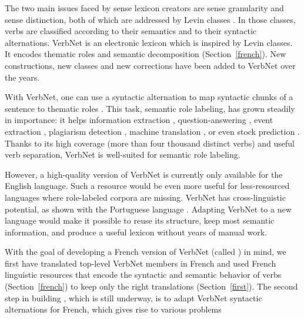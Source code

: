 The two main issues faced by sense lexicon creators are sense granularity and
sense distinction, both of which are addressed by Levin classes
\citep{levin1993english}. In those classes, verbs are classified according
to their semantics and to their syntactic alternations. VerbNet
\citep{kipperschuler2005verbnet} is an electronic lexicon which is inspired
by Levin classes. It encodes thematic roles and semantic decomposition
(Section~\ref{french}).  New constructions, new classes and new corrections
have been added to VerbNet over the years.

With VerbNet, one can use a syntactic alternation to map syntactic chunks of a
sentence to thematic roles
\citep{swier2005exploiting,pradet2013revisiting}. This task, semantic role
labeling, has grown steadily in importance: it helps information extraction
\citep{surdeanu2003using}, question-answering \citep{shen2007using},
event extraction \citep{exner2011using}, plagiarism detection
\citep{osman2012improved}, machine translation
\citep{bazrafshan2013semantic}, or even stock prediction
\citep{xie2013semantic}. Thanks to its high coverage (more than four
thousand distinct verbs) and useful verb separation, VerbNet is well-suited for
semantic role labeling.

However, a high-quality version of VerbNet is currently only available for the
English language. Such a resource would be even more useful for less-resourced
languages where role-labeled corpora are missing. VerbNet has cross-linguistic
potential, as shown with the Portuguese language \citep[section
2.2.2]{kipperschuler2005verbnet}. Adapting VerbNet to a new language would make
it possible to reuse its structure, keep most semantic information, and produce
a useful lexicon without years of manual work.

With the goal of developing a French version of VerbNet (called \verbenet{}) in
mind, we first have translated top-level VerbNet members in French and used
French linguistic resources that encode the syntactic and semantic behavior of
verbs (Section~\ref{french}) to keep only the right translations
(Section~\ref{first}).
The second step in building \verbenet{}, which is still underway, is to adapt
VerbNet syntactic alternations for French, which gives rise to various problems

